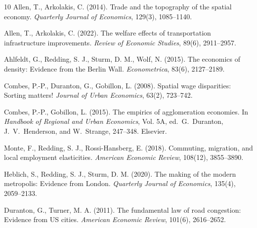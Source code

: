 
\begin{thebibliography}{10}
Allen, T., Arkolakis, C. (2014). Trade and the topography of the
spatial economy. \emph{Quarterly Journal of Economics}, 129(3),
1085--1140.

Allen, T., Arkolakis, C. (2022). The welfare effects of transportation
infrastructure improvements. \emph{Review of Economic Studies},
89(6), 2911--2957.

Ahlfeldt, G., Redding, S. J., Sturm, D. M., Wolf, N. (2015). The
economics of density: Evidence from the Berlin Wall.
\emph{Econometrica}, 83(6), 2127--2189.

Combes, P.-P., Duranton, G., Gobillon, L. (2008). Spatial wage
disparities: Sorting matters! \emph{Journal of Urban Economics},
63(2), 723--742.

Combes, P.-P., Gobillon, L. (2015). The empirics of agglomeration
economies. In \emph{Handbook of Regional and Urban Economics}, Vol.
5A, ed.\ G.\ Duranton, J.\ V.\ Henderson, and W.\ Strange, 247--348.
Elsevier.

Monte, F., Redding, S. J., Rossi-Hansberg, E. (2018). Commuting,
migration, and local employment elasticities. \emph{American Economic
Review}, 108(12), 3855--3890.

Heblich, S., Redding, S. J., Sturm, D. M. (2020). The making of the
modern metropolis: Evidence from London. \emph{Quarterly Journal of
Economics}, 135(4), 2059--2133.

Duranton, G., Turner, M. A. (2011). The fundamental law of road
congestion: Evidence from US cities. \emph{American Economic Review},
101(6), 2616--2652.
\end{thebibliography}


